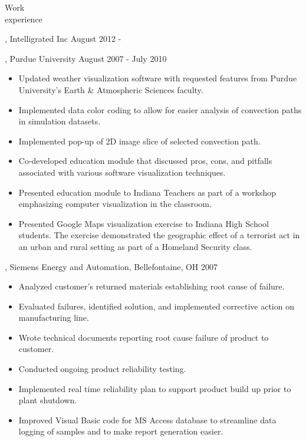 \begin{category}{Work \\experience}

, Intelligrated Inc  August 2012 - 
\begin{itemize}
\end{itemize}


, Purdue University  August 2007 - July 2010 
\begin{itemize}
\item Updated weather visualization software with requested features from Purdue University's Earth \& Atmospheric Sciences faculty.
\item Implemented data color coding to allow for easier analysis of convection paths in simulation datasets.
\item Implemented pop-up of 2D image slice of selected convection path. %
\item Co-developed education module that discussed pros, cons, and pitfalls associated with various software visualization techniques.
\item Presented education module to Indiana Teachers as part of a workshop emphasizing computer visualization in the classroom.
\item Presented Google Maps visualization exercise to Indiana High School students. The exercise demonstrated the geographic effect of a terrorist act in an urban and rural setting as part of a Homeland Security class.
\end{itemize}

, Siemens Energy and Automation, Bellefontaine, OH  2007 
\begin{itemize}
\item Analyzed customer's returned materials establishing root cause of failure.
\item Evaluated failures, identified solution, and implemented corrective action on manufacturing line.
\item Wrote technical documents reporting root cause failure of product to customer.
\item Conducted ongoing product reliability testing.
\item Implemented real time reliability plan to support product build up prior to plant shutdown.
\item Improved Visual Basic code for MS Access database to streamline data logging of samples and to make report generation easier.
\end{itemize}


\end{category}
